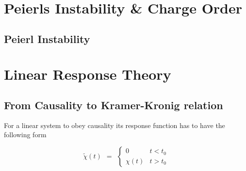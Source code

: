 \documentclass[10pt]{report}
\numberwithin{equation}{chapter}
\begin{document}
%


\chapter{Peierls Instability \& Charge Order}

\section{Peierl Instability}


%

\chapter{Linear Response Theory}

\section{From Causality to Kramer-Kronig relation}


For a linear system to obey causality its response function has to have the following form

\begin{equation} \label{eq:response_causality}
  \tilde{\chi}(t) ~~ = ~~ \left\{ \begin{array}{lc} 
    0        &  t < t_0 \\
    \chi(t)  &  t > t_0
  \end{array}\right.
\end{equation}
\end{document}
